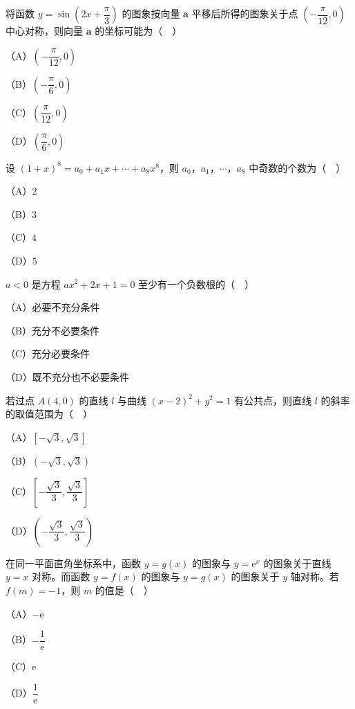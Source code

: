 \begin{question}
将函数 $y=\sin\left(2x+\dfrac{\pi}{3}\right)$ 的图象按向量 $\boldsymbol a$ 平移后所得的图象关于点 $\left(-\dfrac{\pi}{12},0\right)$ 中心对称，则向量 $\boldsymbol a$ 的坐标可能为（　）

（A）$\left(-\dfrac{\pi}{12},0\right)$

（B）$\left(-\dfrac{\pi}{6},0\right)$

（C）$\left(\dfrac{\pi}{12},0\right)$

（D）$\left(\dfrac{\pi}{6},0\right)$

\end{question}
\begin{question}
设 $(1+x)^8=a_0+a_1x+\cdots+a_8x^8$，则 $a_0$，$a_1$，$\cdots$，$a_8$ 中奇数的个数为（　）

（A）$2$

（B）$3$

（C）$4$

（D）$5$

\end{question}
\begin{question}
$a<0$ 是方程 $ax^2+2x+1=0$ 至少有一个负数根的（　）

（A）必要不充分条件

（B）充分不必要条件

（C）充分必要条件

（D）既不充分也不必要条件

\end{question}
\begin{question}
若过点 $A(4,0)$ 的直线 $l$ 与曲线 $(x-2)^2+y^2=1$ 有公共点，则直线 $l$ 的斜率的取值范围为（　）

（A）$[-\sqrt3,\sqrt3]$

（B）$(-\sqrt3,\sqrt3)$

（C）$\left[-\dfrac{\sqrt3}{3},\dfrac{\sqrt3}{3}\right]$

（D）$\left(-\dfrac{\sqrt3}{3},\dfrac{\sqrt3}{3}\right)$

\end{question}
\begingroup
\renewenvironment{question}{\Needspace{0.48\textheight}}{}
\begin{question}
在同一平面直角坐标系中，函数 $y=g(x)$ 的图象与 $y=\mathrm e^x$ 的图象关于直线 $y=x$ 对称。而函数 $y=f(x)$ 的图象与 $y=g(x)$ 的图象关于 $y$ 轴对称。若 $f(m)=-1$，则 $m$ 的值是（　）

（A）$-\mathrm e$

（B）$-\dfrac1{\mathrm e}$

（C）$\mathrm e$

（D）$\dfrac1{\mathrm e}$

\Needspace{0.4\textheight}
\end{question}
